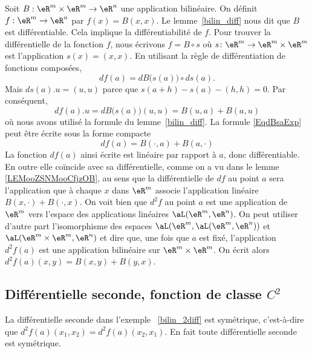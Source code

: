 \begin{example}\label{bilin_2diff}
	Soit $B:\eR^m\times \eR^m\to\eR^n$ une application bilinéaire. On définit $f:\eR^m\to\eR^n$ par $f(x)=B(x,x)$. Le lemme~\ref{bilin_diff} nous dit que $B$ est différentiable. Cela implique la différentiabilité de $f$. Pour trouver la différentielle de la fonction $f$, nous écrivons $f=B\circ s$ où $s\colon \eR^m\to \eR^m\times\eR^m$ est l'application $s(x)=(x,x)$. En utilisant la règle de différentiation de fonctions composées,
	\begin{equation}
		df(a)=dB\big( s(a) \big)\circ ds(a).
	\end{equation}
	Mais $ds(a).u=(u,u)$ parce que $s(a+h)-s(a)-(h,h)=0$. Par conséquent,
	\begin{equation}		\label{EqdBsaExp}
		df(a).u=dB\big( s(a) \big)(u,u)=B(u,a)+B(a,u)
	\end{equation}
	où nous avons utilisé la formule du lemme~\ref{bilin_diff}. La formule \eqref{EqdBsaExp} peut être écrite sous la forme compacte
	\begin{equation}
		df(a)=B(\cdot,a)+B(a,\cdot)
	\end{equation}
    La fonction $df(a)$ ainsi écrite est linéaire par rapport à $a$, donc différentiable. En outre elle coïncide avec sa différentielle, comme on a vu dans le lemme \ref{LEMooZSNMooCfjzOB}, au sens que la différentielle de $df$ au point $a$ sera l'application que à chaque $x$ dans $\eR^m$ associe l'application linéaire $B(x,\cdot)+B(\cdot, x)$. On voit bien que $d^2f$ au point $a$ est une application de $\eR^m$ vers l'espace des applications linéaires $\aL(\eR^m, \eR^n)$. On peut utiliser d'autre part l'isomorphisme des espaces $\aL(\eR^m,\aL(\eR^m, \eR^n) )$ et $\aL(\eR^m\times\eR^m, \eR^n )$ et dire que, une fois que $a$ est fixé, l'application $d^2f(a)$ est une application bilinéaire sur $\eR^m\times\eR^m$. On écrit alors $d^2f(a)(x,y)=B(x,y)+B(y,x)$.
\end{example}

\subsection{Différentielle seconde, fonction de classe \texorpdfstring{$ C^2$}{C2}}

La différentielle seconde dans l'exemple ~\ref{bilin_2diff} est symétrique, c'est-à-dire que $d^2f(a)(x_1,x_2)=d^2f(a)(x_2,x_1)$. En fait toute différentielle seconde est symétrique.

